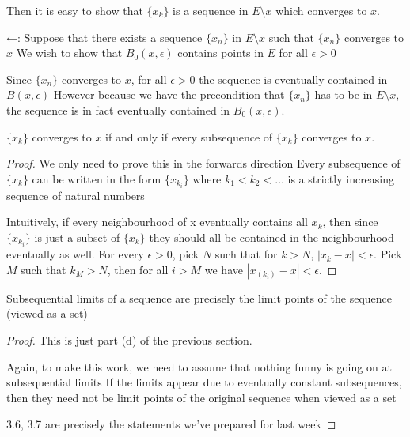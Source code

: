 \begin{enumerate}
Then it is easy to show that $\{x_k\}$ is a sequence in $E\setminus x$ which converges to $x$.

←: Suppose that there exists a sequence $\{x_n\}$ in $E\setminus x$ such that $\{x_n\}$ converges to $x$
We wish to show that $B_0(x,\epsilon)$ contains points in $E$ for all $\epsilon>0$

Since $\{x_n\}$ converges to $x$, for all $\epsilon>0$ the sequence is eventually contained in $B(x,\epsilon)$
However because we have the precondition that $\{x_n\}$ has to be in $E\setminus x$, the sequence is in fact eventually contained in $B_0(x,\epsilon)$.
\end{enumerate}


\begin{proposition}
$\{x_k\}$ converges to $x$ if and only if every subsequence of $\{x_k\}$ converges to $x$.
\end{proposition}

\begin{proof}
We only need to prove this in the forwards direction
Every subsequence of $\{x_k\}$ can be written in the form $\{x_{k_i}\}$ where $k_1<k_2<\dots$ is a strictly increasing sequence of natural numbers

Intuitively, if every neighbourhood of x eventually contains all $x_k$, then since $\{x_{k_i}\}$ is just a subset of $\{x_k\}$ they should all be contained in the neighbourhood eventually as well.
For every $\epsilon>0$, pick $N$ such that for $k>N$, $|x_k-x|<\epsilon$.
Pick $M$ such that $k_M>N$, then for all $i>M$ we have $|x_(k_i)-x|<\epsilon$.
\end{proof}

\begin{proposition}
Subsequential limits of a sequence are precisely the limit points of the sequence (viewed as a set)
\end{proposition}

\begin{proof}
This is just part (d) of the previous section.

Again, to make this work, we need to assume that nothing funny is going on at subsequential limits
If the limits appear due to eventually constant subsequences, then they need not be limit points of the original sequence when viewed as a set

3.6, 3.7 are precisely the statements we've prepared for last week
\end{proof}

